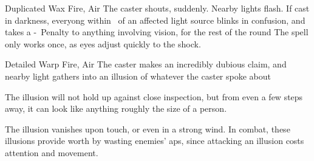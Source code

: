 \ifodd\value{diceNo}

  {Duplicated}%
  {Wax}%
  {Fire, Air}%
  {}%
  {The caster shouts, suddenly.
  Nearby lights flash.
  If cast in darkness, everyong within \spellRange\ of an affected light source blinks in confusion, and takes a -~Penalty to anything involving vision, for the rest of the round}%
  {The spell only works once, as eyes adjust quickly to the shock.}

\else

  {Detailed}%
  {Warp}%
  {Fire, Air}%
  {}%
  {The caster makes an incredibly dubious claim, and nearby light gathers into an illusion of whatever the caster spoke about}%
  {The illusion will not hold up against close inspection, but from even a few steps away, it can look like anything roughly the size of a person.

  The illusion vanishes upon touch, or even in a strong wind.
  In combat, these illusions provide worth by wasting enemies' \glspl{ap}, since attacking an illusion costs attention and movement.}

\fi

